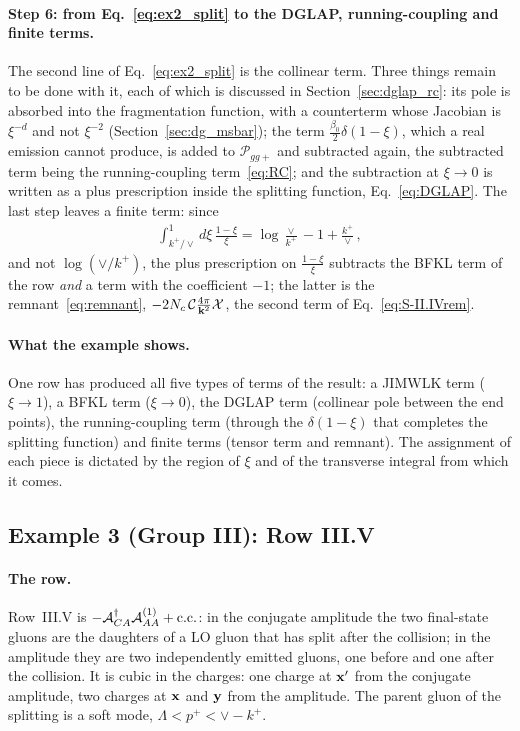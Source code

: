 \paragraph{Step 6: from Eq.~\eqref{eq:ex2_split} to the DGLAP, running-coupling and finite terms.} The second line of Eq.~\eqref{eq:ex2_split} is the collinear term. Three things remain to be done with it, each of which is discussed in Section~\ref{sec:dglap_rc}: its pole is absorbed into the fragmentation function, with a counterterm whose Jacobian is $\xi^{-d}$ and not $\xi^{-2}$ (Section~\ref{sec:dg_msbar}); the term $\frac{\beta_0}{2}\delta(1-\xi)$, which a real emission cannot produce, is added to $\mathcal P_{gg+}$ and subtracted again, the subtracted term being the running-coupling term~\eqref{eq:RC}; and the subtraction at $\xi\to0$ is written as a plus prescription inside the splitting function, Eq.~\eqref{eq:DGLAP}. The last step leaves a finite term: since
\begin{align}\label{eq:ex2_rem}
\int_{k^+/\vee}^1d\xi\,\frac{1-\xi}{\xi}=\log\frac{\vee}{k^+}-1+\frac{k^+}{\vee}\,,
\end{align}
and not $\log(\vee/k^+)$, the plus prescription on $\frac{1-\xi}{\xi}$ subtracts the BFKL term of the row \emph{and} a term with the coefficient $-1$; the latter is the remnant~\eqref{eq:remnant}, $-2N_c\,\mathcal C\frac{4\pi}{\mathbf{k}^2}\mathcal X$, the second term of Eq.~\eqref{eq:S-II.IVrem}.

\paragraph{What the example shows.} One row has produced all five types of terms of the result: a JIMWLK term ($\xi\to1$), a BFKL term ($\xi\to0$), the DGLAP term (collinear pole between the end points), the running-coupling term (through the $\delta(1-\xi)$ that completes the splitting function) and finite terms (tensor term and remnant). The assignment of each piece is dictated by the region of $\xi$ and of the transverse integral from which it comes.

\subsection{Example 3 (Group III): Row III.V}\label{sec:ex_III_V}

\paragraph{The row.} Row~III.V is $-\mathcal A^\dagger_{CA}\mathcal A^{(1)}_{AA}+{\rm c.c.}$: in the conjugate amplitude the two final-state gluons are the daughters of a LO gluon that has split after the collision; in the amplitude they are two independently emitted gluons, one before and one after the collision. It is cubic in the charges: one charge at $\mathbf{x}'$ from the conjugate amplitude, two charges at $\mathbf{x}$ and $\mathbf{y}$ from the amplitude. The parent gluon of the splitting is a soft mode, $\Lambda<p^+<\vee-k^+$.


